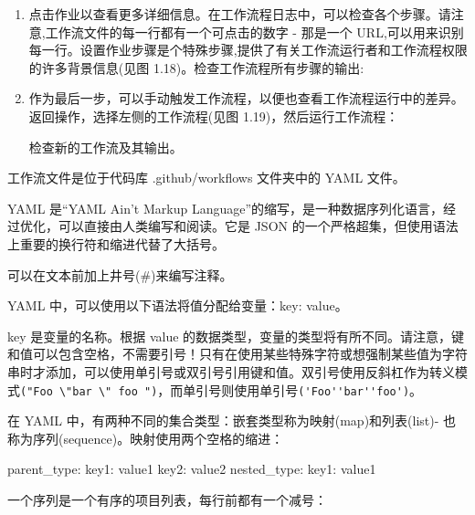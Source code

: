 \begin{enumerate}

\item 
点击作业以查看更多详细信息。在工作流程日志中，可以检查各个步骤。请注意,工作流文件的每一行都有一个可点击的数字 - 那是一个 URL,可以用来识别每一行。设置作业步骤是个特殊步骤,提供了有关工作流运行者和工作流程权限的许多背景信息(见图 1.18)。检查工作流程所有步骤的输出:


\item 
作为最后一步，可以手动触发工作流程，以便也查看工作流程运行中的差异。返回操作，选择左侧的工作流程(见图 1.19)，然后运行工作流程：


检查新的工作流及其输出。

\end{enumerate}


工作流文件是位于代码库 .github/workflows 文件夹中的 YAML 文件。


YAML 是“YAML Ain’t Markup Language”的缩写，是一种数据序列化语言，经过优化，可以直接由人类编写和阅读。它是 JSON 的一个严格超集，但使用语法上重要的换行符和缩进代替了大括号。

可以在文本前加上井号(\#)来编写注释。

YAML 中，可以使用以下语法将值分配给变量：key: value。

key 是变量的名称。根据 value 的数据类型，变量的类型将有所不同。请注意，键和值可以包含空格，不需要引号！只有在使用某些特殊字符或想强制某些值为字符串时才添加，可以使用单引号或双引号引用键和值。双引号使用反斜杠作为转义模式\verb|("Foo \"bar \" foo ")|，而单引号则使用单引号\verb|('Foo''bar''foo')|。


在 YAML 中，有两种不同的集合类型：嵌套类型称为映射(map)和列表(list)- 也称为序列(sequence)。映射使用两个空格的缩进：

\begin{shell}
parent_type:
  key1: value1
  key2: value2
  nested_type:
    key1: value1
\end{shell}

一个序列是一个有序的项目列表，每行前都有一个减号：

